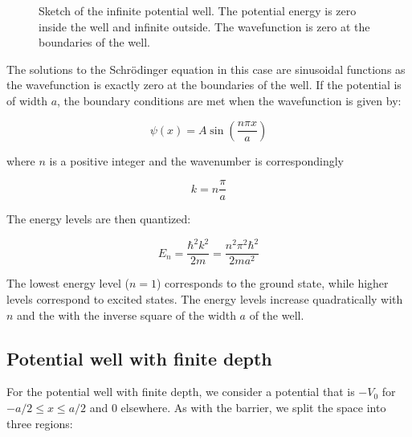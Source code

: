 \documentclass[
  a4paper,
]{book}
\begin{document}
\begin{figure}


\caption{\label{fig-infinite-well}Sketch of the infinite potential well.
The potential energy is zero inside the well and infinite outside. The
wavefunction is zero at the boundaries of the well.}

\end{figure}%

The solutions to the Schrödinger equation in this case are sinusoidal
functions as the wavefunction is exactly zero at the boundaries of the
well. If the potential is of width \(a\), the boundary conditions are
met when the wavefunction is given by:

\[\psi(x) = A \sin\left(\frac{n\pi x}{a}\right)\]

where \(n\) is a positive integer and the wavenumber is correspondingly

\[
k=n\frac{\pi}{a}
\]

The energy levels are then quantized:

\[E_n = \frac{\hbar^2 k^2}{2m}=\frac{n^2\pi^2\hbar^2}{2ma^2}\]

The lowest energy level (\(n=1\)) corresponds to the ground state, while
higher levels correspond to excited states. The energy levels increase
quadratically with \(n\) and the with the inverse square of the width
\(a\) of the well.

\subsection{Potential well with finite
depth}\label{potential-well-with-finite-depth}

For the potential well with finite depth, we consider a potential that
is \(-V_0\) for \(-a/2 \leq x \leq a/2\) and 0 elsewhere. As with the
barrier, we split the space into three regions:
\end{document}
